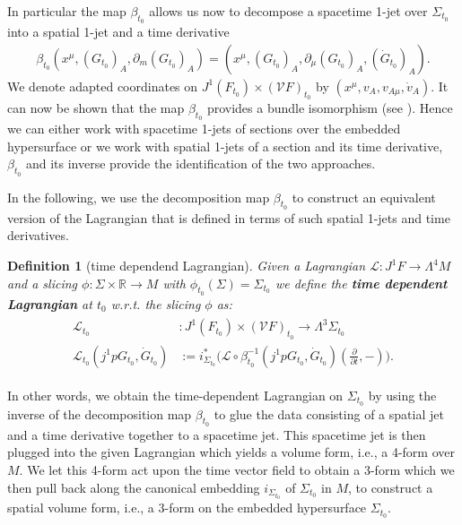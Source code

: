 \documentclass[a4paper,12pt, DIV=14, BCOR=5mm, twoside, headsepline, numbers=noenddot]{scrbook}
\newtheorem{definition}{Definition}[section]
\begin{document}
In particular the map $\beta_{t_0}$ allows us now to decompose a spacetime 1-jet over $\Sigma_{t_0}$ into a spatial 1-jet and a time derivative
\begin{align}
    \beta_{t_0}(x^{\mu},(G_{t_0})_A, \partial_m(G_{t_0})_A) = (x^{\mu},(G_{t_0})_A, \partial_{\mu}(G_{t_0})_A, (\dot{G}_{t_0})_A).
\end{align}
We denote adapted coordinates on $J^1(F_{t_0}) \times (\mathcal{V}F)_{t_0}$ by $(x^{\mu}, v_A, v_{A{\mu}}, \dot{v}_A)$. It can now be shown that the map $\beta_{t_0}$ provides a bundle isomorphism (see \cite{2004math.ph..11032G}). Hence we can either work with spacetime 1-jets of sections over the embedded hypersurface or we work with spatial 1-jets of a section and its time derivative, $\beta_{t_0}$ and its inverse provide the identification of the two approaches.

In the following, we use the decomposition map $\beta_{t_0}$ to construct an equivalent version of the Lagrangian that is defined in terms of such spatial 1-jets and time derivatives. 
\begin{definition}[time dependend Lagrangian]
Given a Lagrangian $\mathcal{L} : J^1F \rightarrow \Lambda^4M$ and a slicing $\phi : \Sigma \times \mathbb{R} \rightarrow M$ with $\phi_{t_0}(\Sigma) = \Sigma_{t_0}$ we define the \textbf{\textit{time dependent Lagrangian}} at $t_0$ w.r.t. the slicing $\phi$ as:
\begin{align}
\begin{aligned}
    \mathcal{L}_{t_0} &: J^1(F_{t_0}) \times (\mathcal{V}F)_{t_0} \longrightarrow \Lambda^3\Sigma_{t_0}\\
    \mathcal{L}_{t_0}(j^1pG_{t_0}, \dot{G}_{t_0}) &:= i_{\Sigma_{t_0}}^{\ast} \bigl( \mathcal{L}\circ \beta_{t_0}^{-1}(j^1pG_{t_0}, \dot{G}_{t_0})(\frac{\partial}{\partial t},-)\bigr). 
\end{aligned}
\end{align}
\end{definition}

In other words, we obtain the time-dependent Lagrangian on $\Sigma_{t_0}$ by using the inverse of the decomposition map $\beta_{t_0}$ to glue the data consisting of a spatial jet and a time derivative together to a spacetime jet. This spacetime jet is then plugged into the given Lagrangian which yields a volume form, i.e., a 4-form over $M$. We let this 4-form act upon the time vector field to obtain a 3-form which we then pull back along the canonical embedding $i_{\Sigma_{t_0}}$ of $\Sigma_{t_0}$ in $M$, to construct a spatial volume form, i.e., a 3-form on the embedded hypersurface $\Sigma_{t_0}$. 
\end{document}

